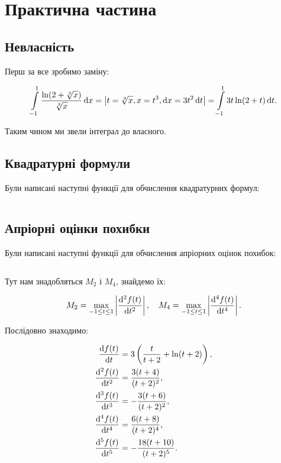 \section{Практична частина}

\subsection{Невласність}

Перш за все зробимо заміну:

\begin{equation}
	\displaystyle\int\limits_{-1}^1 \frac{\ln(2 + \sqrt[3]{x})}{\sqrt[3]{x}} \mathop{}\!\mathrm{d} x = \left| t = \sqrt[3]{x}, x = t^3, \mathop{}\!\mathrm{d} x = 3 t^2 \mathop{}\!\mathrm{d} t \right| = \displaystyle\int\limits_{-1}^1 3 t \ln(2 + t) \mathop{}\!\mathrm{d} t.
\end{equation}

Таким чином ми звели інтеграл до власного.

\subsection{Квадратурні формули}

Були написані наступні функції для обчислення квадратурних формул:

\inputminted[firstline=6]{python}{../py/integrate.py}

\subsection{Апріорні оцінки похибки}

Були написані наступні функції для обчислення апріорних оцінок похибок:

\inputminted[firstline=4]{python}{../py/apriori_error.py}

Тут нам знадобляться $M_2$ і $M_4$, знайдемо їх:

\begin{equation}
	M_2 = \displaystyle\max\limits_{-1 \le t \le 1} \left| \frac{\mathop{}\!\mathrm{d}^2 f(t)}{\mathop{}\!\mathrm{d} t^2} \right|, \quad M_4 = \displaystyle\max\limits_{-1 \le t \le 1} \left| \frac{\mathop{}\!\mathrm{d}^4 f(t)}{\mathop{}\!\mathrm{d} t^4} \right|.
\end{equation}

Послідовно знаходимо:

\begin{align}
	\frac{\diff f(t)}{\diff t} &= 3 \left( \frac{t}{t + 2} + \ln (t + 2) \right), \\
	\frac{\diff^2 f(t)}{\diff t^2} &= \frac{3 (t + 4)}{(t + 2)^2}, \\
	\frac{\diff^3 f(t)}{\diff t^3} &= - \frac{3 (t + 6)}{(t + 2)^2}, \\
	\frac{\diff^4 f(t)}{\diff t^4} &= \frac{6 (t + 8)}{(t + 2)^4}, \\
	\frac{\diff^5 f(t)}{\diff t^5} &= - \frac{18 (t + 10)}{(t + 2)^5}.
\end{align}

